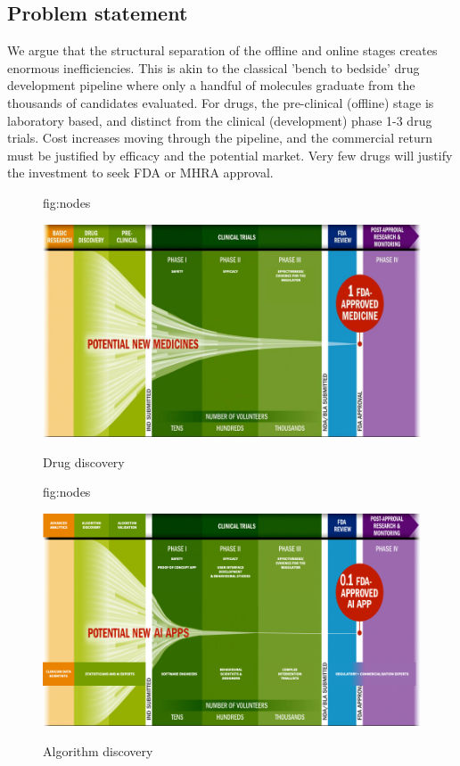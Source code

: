 \documentclass[pmlr,twocolumn,10pt]{jmlr} %
\newtheorem*{note}{Note}
\begin{document}

\subsection{Problem statement}
We argue that the structural separation of the offline and online stages creates enormous inefficiencies.\citep{vaitla2020a} This is akin to the classical 'bench to bedside' drug development pipeline where only a handful of molecules graduate from the thousands of candidates evaluated. For drugs, the pre-clinical (offline) stage is laboratory based, and distinct from the clinical (development) phase 1-3 drug trials. Cost increases moving through the pipeline, and the commercial return must be justified by efficacy and the potential market. Very few drugs will justify the investment to seek FDA or MHRA approval. 

\begin{figure}[htbp]
\floatconts
  {fig:nodes}
  {\caption{Drug discovery}}
  {\includegraphics[width=1.0\linewidth]{images/pipeline-drugs.png}}
\end{figure}

\begin{figure}[htbp]
\floatconts
  {fig:nodes}
  {\caption{Algorithm discovery}}
  {\includegraphics[width=1.0\linewidth]{images/pipeline-algorithms.png}}
\end{figure}
\end{document}
